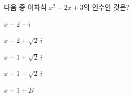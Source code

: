 다음 중 이차식 $x^2-2x+3$의 인수인 것은?
\begin{choicesii}{\rule[-3ex]{0pt}{8ex}$x-2-i$}{\rule[-3ex]{0pt}{8ex}$x-2+\sqrt{2}\,i$}{\rule[-3ex]{0pt}{8ex}$x-1+\sqrt{2}\,i$}{\rule[-3ex]{0pt}{8ex}$x+1-\sqrt{2}\,i$}{\rule[-3ex]{0pt}{8ex}$x+1+2i$}\end{choicesii}
